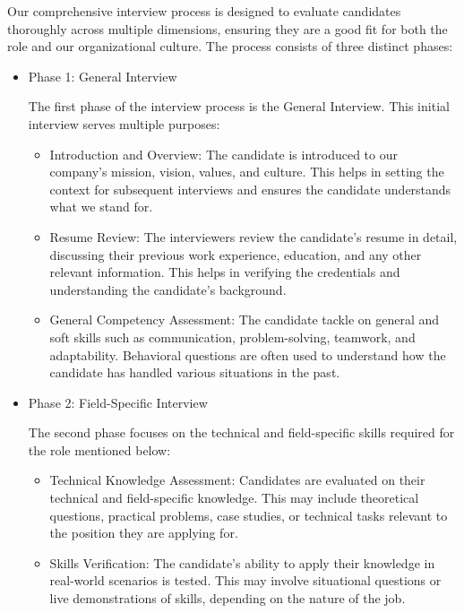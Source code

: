 Our comprehensive interview process is designed to evaluate candidates thoroughly across multiple dimensions, ensuring they are a good fit for both the role and our organizational culture. The process consists of three distinct phases:
\begin{itemize}
\item Phase 1: General Interview

The first phase of the interview process is the General Interview. This initial interview serves multiple purposes:

     \begin{itemize}

    \item Introduction and Overview:
        The candidate is introduced to our company's mission, vision, values, and culture. This helps in setting the context for subsequent interviews and ensures the candidate understands what we stand for.

    \item Resume Review:
        The interviewers review the candidate’s resume in detail, discussing their previous work experience, education, and any other relevant information. This helps in verifying the credentials and understanding the candidate’s background.

    \item General Competency Assessment:
        The candidate tackle on general and soft skills such as communication, problem-solving, teamwork, and adaptability. Behavioral questions are often used to understand how the candidate has handled various situations in the past.
   \end{itemize} 
\item Phase 2: Field-Specific Interview

The second phase focuses on the technical and field-specific skills required for the role mentioned below:
    \begin{itemize}
    \item Technical Knowledge Assessment:
        Candidates are evaluated on their technical and field-specific knowledge. This may include theoretical questions, practical problems, case studies, or technical tasks relevant to the position they are applying for.

    \item Skills Verification:
        The candidate’s ability to apply their knowledge in real-world scenarios is tested. This may involve situational questions or live demonstrations of skills, depending on the nature of the job.


\end{itemize}
\end{itemize}
